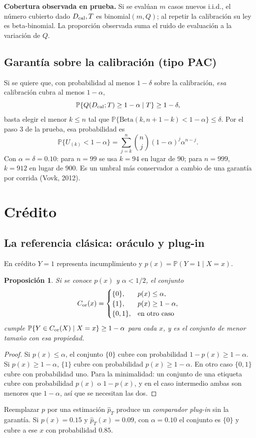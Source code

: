 \documentclass[11pt]{article}
\theoremstyle{plain}
\newtheorem{proposicion}[teorema]{Proposición}
\theoremstyle{definition}
\theoremstyle{remark}
\newcommand{\Prob}{\mathbb P}
\newcommand{\phat}{\widehat p}
\newcommand{\dest}[1]{\par\needspace{4\baselineskip}\textbf{#1}\quad}
\newcommand{\lamina}[1]{}%
\begin{document}
\dest{Cobertura observada en prueba.} Si se evalúan $m$ casos nuevos i.i.d., el número cubierto dado
$D_{\rm cal},T$ es binomial$(m,Q)$; al repetir la calibración su ley es beta-binomial. La proporción
observada suma el ruido de evaluación a la variación de $Q$.

\subsection{Garantía sobre la calibración (tipo PAC)}
Si se quiere que, con probabilidad al menos $1-\delta$ sobre la calibración, \emph{esa} calibración
cubra al menos $1-\alpha$,
\[
 \Prob\{Q(D_{\rm cal};T)\ge1-\alpha\mid T\}\ge1-\delta,
\]
basta elegir el menor $k\le n$ tal que $\Prob\{\mathrm{Beta}(k,n+1-k)<1-\alpha\}\le\delta$. Por el
paso 3 de la prueba, esa probabilidad es
\[
 \Prob\{U_{(k)}<1-\alpha\}=\sum_{j=k}^n\binom nj(1-\alpha)^j\alpha^{n-j}.
\]
Con $\alpha=\delta=0.10$: para $n=99$ se usa $k=94$ en lugar de $90$; para $n=999$, $k=912$ en lugar
de $900$. Es un umbral más conservador a cambio de una garantía por corrida (Vovk, 2012).

\section{Crédito}\label{sec:credito}\lamina{19--23}
\subsection{La referencia clásica: oráculo y plug-in}
En crédito $Y=1$ representa incumplimiento y $p(x)=\Prob(Y=1\mid X=x)$.
\begin{proposicion}
Si se conoce $p(x)$ y $\alpha<1/2$, el conjunto
\[
 C_{\rm or}(x)=\begin{cases}\{0\},&p(x)\le\alpha,\\\{1\},&p(x)\ge1-\alpha,\\\{0,1\},&\text{en otro caso}\end{cases}
\]
cumple $\Prob\{Y\in C_{\rm or}(X)\mid X=x\}\ge1-\alpha$ para cada $x$, y es el conjunto de menor
tamaño con esa propiedad.
\end{proposicion}
\begin{proof}
Si $p(x)\le\alpha$, el conjunto $\{0\}$ cubre con probabilidad $1-p(x)\ge1-\alpha$. Si
$p(x)\ge1-\alpha$, $\{1\}$ cubre con probabilidad $p(x)\ge1-\alpha$. En otro caso $\{0,1\}$ cubre con
probabilidad uno. Para la minimalidad: un conjunto de una etiqueta cubre con probabilidad $p(x)$ o
$1-p(x)$, y en el caso intermedio ambas son menores que $1-\alpha$, así que se necesitan las dos.
\end{proof}
Reemplazar $p$ por una estimación $\phat_T$ produce un \emph{comparador plug-in} sin la garantía. Si
$p(x)=0.15$ y $\phat_T(x)=0.09$, con $\alpha=0.10$ el conjunto es $\{0\}$ y cubre a ese $x$ con
probabilidad $0.85$.
\end{document}
